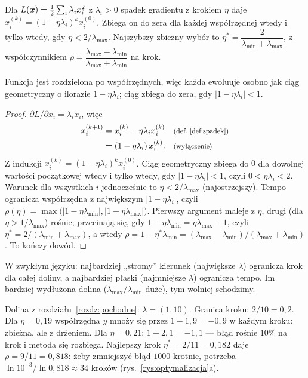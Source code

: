 \begin{twierdzenie}\label{tw:eta}
Dla $L(\bm{x})=\tfrac12\sum_{i}\lambda_ix_i^2$ z $\lambda_i>0$ spadek gradientu z krokiem $\eta$ daje $x_i^{(k)}=(1-\eta\lambda_i)^kx_i^{(0)}$. Zbiega on do zera dla każdej współrzędnej wtedy i tylko wtedy, gdy
$\eta<2/\lambda_{\max}$. Najszybszy zbieżny wybór to $\eta^\ast=\dfrac{2}{\lambda_{\min}+\lambda_{\max}}$, z współczynnikiem $\rho=\dfrac{\lambda_{\max}-\lambda_{\min}}{\lambda_{\max}+\lambda_{\min}}$ na krok.
\end{twierdzenie}
\begin{pomyslDowodu}
Funkcja jest rozdzielona po współrzędnych, więc każda ewoluuje osobno jak ciąg geometryczny o ilorazie $1-\eta\lambda_i$; ciąg zbiega do zera, gdy $|1-\eta\lambda_i|<1$.
\end{pomyslDowodu}
\begin{proof}
$\partial L/\partial x_i=\lambda_ix_i$, więc
\begin{align*}
x_i^{(k+1)} &= x_i^{(k)}-\eta\lambda_ix_i^{(k)} && \text{\footnotesize (def.~\ref{def:spadek})}\\
 &= (1-\eta\lambda_i)\,x_i^{(k)}. && \text{\footnotesize (wyłączenie)}
\end{align*}
Z indukcji $x_i^{(k)}=(1-\eta\lambda_i)^kx_i^{(0)}$. Ciąg geometryczny zbiega do $0$ dla dowolnej wartości początkowej wtedy i tylko wtedy, gdy $|1-\eta\lambda_i|<1$, czyli $0<\eta\lambda_i<2$.
Warunek dla wszystkich $i$ jednocześnie to $\eta<2/\lambda_{\max}$ (najostrzejszy). Tempo ogranicza współrzędna z największym $|1-\eta\lambda_i|$, czyli $\rho(\eta)=\max\big(|1-\eta\lambda_{\min}|,|1-\eta\lambda_{\max}|\big)$.
Pierwszy argument maleje z $\eta$, drugi (dla $\eta>1/\lambda_{\max}$) rośnie; przecinają się, gdy $1-\eta\lambda_{\min}=\eta\lambda_{\max}-1$, czyli $\eta^\ast=2/(\lambda_{\min}+\lambda_{\max})$, a wtedy $\rho=1-\eta^\ast\lambda_{\min}=(\lambda_{\max}-\lambda_{\min})/(\lambda_{\max}+\lambda_{\min})$. To kończy dowód.
\end{proof}

W zwykłym języku: najbardziej „stromy” kierunek (największe $\lambda$) ogranicza krok dla całej doliny, a najbardziej płaski (najmniejsze $\lambda$) ogranicza tempo. Im bardziej wydłużona dolina ($\lambda_{\max}/\lambda_{\min}$ duże), tym wolniej schodzimy.

\begin{naliczbach}
Dolina z rozdziału~\ref{rozdz:pochodne}: $\lambda=(1,10)$. Granica kroku: $2/10=0{,}2$. Dla $\eta=0{,}19$ współrzędna $y$ mnoży się przez $1-1{,}9=-0{,}9$ w każdym kroku: zbieżna, ale z drżeniem. Dla $\eta=0{,}21$: $1-2{,}1=-1{,}1$ --- błąd rośnie $10\%$ na krok i metoda się rozbiega.
Najlepszy krok $\eta^\ast=2/11=0{,}182$ daje $\rho=9/11=0{,}818$: żeby zmniejszyć błąd $1000$-krotnie, potrzeba $\ln10^{-3}/\ln0{,}818\approx34$ kroków (rys.~\ref{rys:optymalizacja}a).
\end{naliczbach}

